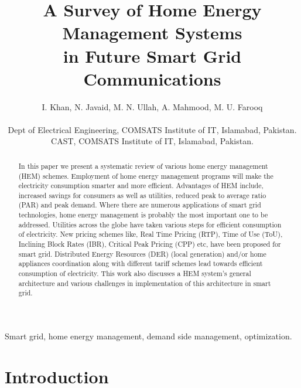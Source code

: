 \documentclass[journal]{IEEEtran}
\begin{document}
\title{A Survey of Home Energy Management Systems\\ in Future Smart Grid Communications}

\author{I. Khan, N. Javaid, M. N. Ullah, A. Mahmood, M. U. Farooq\\\vspace{0.4cm}

Dept of Electrical Engineering, COMSATS Institute of IT, Islamabad, Pakistan.\\
CAST, COMSATS Institute of IT, Islamabad, Pakistan.}

\maketitle

\begin{abstract}
\boldmath
In this paper we present a systematic review of various home energy management (HEM) schemes. Employment of home energy management programs will make the electricity consumption smarter and more efficient. Advantages of HEM  include, increased savings for consumers as well as utilities, reduced peak to average ratio (PAR) and peak demand. Where there are numerous applications of smart grid technologies, home energy management is probably the most important one to be addressed. Utilities across the globe have taken various steps for efficient consumption of electricity. New pricing schemes like, Real Time Pricing (RTP), Time of Use (ToU), Inclining Block Rates (IBR), Critical Peak Pricing (CPP) etc, have been proposed for smart grid. Distributed Energy Resources (DER) (local generation) and/or home appliances coordination along with different tariff schemes lead towards efficient consumption of electricity. This work also discusses a HEM system's general architecture and various challenges in implementation of this architecture in smart grid.

\end{abstract}

\begin{IEEEkeywords}
Smart grid, home energy management, demand side management, optimization.
\end{IEEEkeywords}

\IEEEpeerreviewmaketitle
\section{Introduction}
\end{document}
